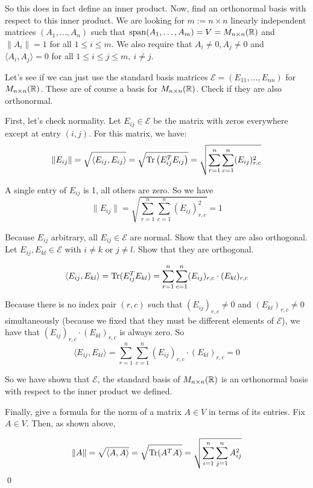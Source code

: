 \documentclass[12pt]{article}
\begin{document}
So this does in fact define an inner product. Now, find an orthonormal basis with respect to this inner product. We are looking for $m := n \times n$ linearly independent matrices $(A_1,\dots,A_n)$ such that $\operatorname{span}(A_1,\dots,A_m) = V = M_{n \times n}(\mathbb{R})$ and $\lVert A_i \rVert = 1$ for all $1 \leq i \leq m$. We also require that $A_i \neq 0, A_j \neq 0$ and $\langle A_i, A_j \rangle = 0$ for all $1 \leq i \leq j \leq m,\ i \neq j$.

Let's see if we can just use the standard basis matrices $\mathcal{E} = (E_{11}, \dots, E_{nn})$ for $M_{n \times n}(\mathbb{R})$. These are of course a basis for $M_{n \times n}(\mathbb{R})$. Check if they are also orthonormal.

First, let's check normality. Let $E_{ij} \in \mathcal{E}$ be the matrix with zeros everywhere except at entry $(i, j)$. For this matrix, we have:
$$
    \lVert E_{ij} \rVert = \sqrt{\langle E_{ij}, E_{ij} \rangle} = \sqrt{\operatorname{Tr} \left(E_{ij}^T E_{ij}\right) } = \sqrt{\sum_{r = 1}^{n} \sum_{c = 1}^{n} (E_{ij})_{r, c}^2}
$$

A single entry of $E_{ij}$ is 1, all others are zero. So we have
$$
    \lVert E_{ij} \rVert = \sqrt{\sum_{r = 1}^{n} \sum_{c = 1}^{n} (E_{ij})_{r, c}^2} = 1
$$

Because $E_{ij}$ arbitrary, all $E_{ij} \in \mathcal{E}$ are normal. Show that they are also orthogonal. Let $E_{ij}, E_{kl} \in \mathcal{E}$ with $i \neq k$ or $j \neq l$. Show that they are orthogonal.

$$
    \langle E_{ij}, E_{kl} \rangle = \operatorname{Tr}(E_{ij}^T E_{kl}) = \sum_{r = 1}^{n} \sum_{c = 1}^{n} (E_{ij})_{r, c} \cdot (E_{kl})_{r, c}
$$

Because there is no index pair $(r, c)$ such that $(E_{ij})_{r, c} \neq 0$ and $(E_{kl})_{r, c} \neq 0$ simultaneously (because we fixed that they must be different elements of $\mathcal{E}$), we have that $(E_{ij})_{r, c} \cdot (E_{kl})_{r, c}$ is always zero. So
$$
    \langle E_{ij}, E_{kl} \rangle = \sum_{r = 1}^{n} \sum_{c = 1}^{n} (E_{ij})_{r, c} \cdot (E_{kl})_{r, c} = 0
$$

So we have shown that $\mathcal{E}$, the standard basis of $M_{n \times n}(\mathbb{R})$ is an orthonormal basis with respect to the inner product we defined.

Finally, give a formula for the norm of a matrix $A \in V$ in terms of its entries. Fix $A \in V$. Then, as shown above,

$$
    \lVert A \rVert = \sqrt{\langle A, A \rangle} = \sqrt{ \operatorname{Tr}(A^T A) } = \sqrt{\sum_{i = 1}^{n} \sum_{j = 1}^{n} A_{ij}^2}
$$ \qed
\end{document}
